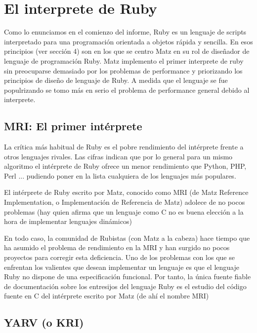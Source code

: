 \documentclass{article}
\begin{document}
\section{El interprete de Ruby}

Como lo enunciamos en el comienzo del informe, Ruby es un lenguaje de scripts interpretado para una programación orientada a objetos rápida y sencilla. En esos principios (ver sección 4) son en los que se centro Matz en su rol de diseñador de lenguaje de programación Ruby. Matz implemento el primer interprete de ruby sin preocuparse demasiado por los problemas de performance y priorizando los principios de diseño de lenguaje de Ruby. A medida que el lenguaje se fue populrizando se tomo más en serio el problema de performance general debido al interprete.


\subsection{MRI: El primer intérprete}

La crítica más habitual de Ruby es el pobre rendimiento del intérprete frente a otros lenguajes rivales. Las cifras indican que por lo general para un mismo algoritmo el intérprete de Ruby ofrece un menor rendimiento que Python, PHP, Perl ... pudiendo poner en la lista cualquiera de los lenguajes más populares.

 El intérprete de Ruby escrito por Matz, conocido como MRI (de Matz Reference Implementation, o Implementación de Referencia de Matz) adolece de no pocos problemas (hay quien afirma que un lenguaje como C no es buena elección a la hora de implementar lenguajes dinámicos)

En todo caso, la comunidad de Rubistas (con Matz a la cabeza) hace tiempo que ha asumido el problema de rendimiento en la MRI y han surgido no pocos proyectos para corregir esta deficiencia. Uno de los problemas con los que se enfrentan los valientes que desean implementar un lenguaje es que el lenguaje Ruby no dispone de una especificación funcional. Por tanto, la única fuente fiable de documentación sobre los entresijos del lenguaje Ruby es el estudio del código fuente en C del intérprete escrito por Matz (de ahí el nombre MRI)
\bigskip



\subsection{YARV (o KRI)}
\end{document}
